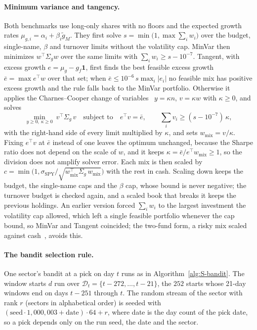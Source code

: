 \paragraph{Minimum variance and tangency.}
Both benchmarks use long-only shares with no floors and the expected growth rates
$\mu_{g,i} = \alpha_i + \beta_i \tilde g_M$. They first solve
$s = \min\big(1, \max \sum_i w_i\big)$ over the budget, single-name, $\beta$ and turnover limits without the
volatility cap. MinVar then minimizes $w^{\top} \Sigma_g w$ over the same limits with
$\sum_i w_i \ge s - 10^{-7}$. Tangent, with excess growth $e = \mu_g - g_f \mathbf{1}$, first finds the best feasible
excess growth $\bar e = \max e^{\top} w$ over that set; when $\bar e \le 10^{-6}\, s \max_i \lvert e_i \rvert$ no
feasible mix has positive excess growth and the rule falls back to the MinVar portfolio. Otherwise it applies the
Charnes--Cooper change of variables~\cite{charnes1962} $y = \kappa n$, $v = \kappa w$ with $\kappa \ge 0$, and solves
\begin{equation}
\min_{y \ge 0,\ \kappa \ge 0} \ v^{\top} \Sigma_g\, v
\quad \text{subject to} \quad e^{\top} v = \bar e, \qquad \textstyle\sum_i v_i \ge (s - 10^{-7})\,\kappa,
\label{eq:S-tangent}
\end{equation}
with the right-hand side of every limit multiplied by $\kappa$, and sets $w_{\mathrm{mix}} = v / \kappa$. Fixing
$e^{\top} v$ at $\bar e$ instead of one leaves the optimum unchanged, because the Sharpe ratio does not depend on the
scale of $w$, and it keeps $\kappa = \bar e / e^{\top} w_{\mathrm{mix}} \ge 1$, so the division does not amplify solver
error. Each mix is then scaled by $c = \min\big(1, \sigma_{\mathrm{SPY}} / \sqrt{w_{\mathrm{mix}}^{\top} \Sigma_g\,
w_{\mathrm{mix}}}\big)$ with the rest in cash. Scaling down keeps the budget, the single-name caps and the $\beta$ cap,
whose bound is never negative; the turnover budget is checked again, and a scaled book that breaks it keeps the
previous holdings. An earlier version forced $\sum_i w_i$ to the largest investment the volatility cap allowed, which
left a single feasible portfolio whenever the cap bound, so MinVar and Tangent coincided; the two-fund form, a risky
mix scaled against cash~\cite{tobin1958}, avoids this.

\paragraph{The bandit selection rule.}
One sector's bandit at a pick on day $t$ runs as in Algorithm~\ref{alg:S-bandit}. The window starts $d$ run over
$\mathcal{D}_t = \{t - 272, \dots, t - 21\}$, the $252$ starts whose 21-day windows end on days $t - 251$ through $t$.
The random stream of the sector with rank $r$ (sectors in alphabetical order) is seeded with
$(\text{seed} \cdot 1{,}000{,}003 + \text{date}) \cdot 64 + r$, where date is the day count of the pick date, so a
pick depends only on the run seed, the date and the sector.

